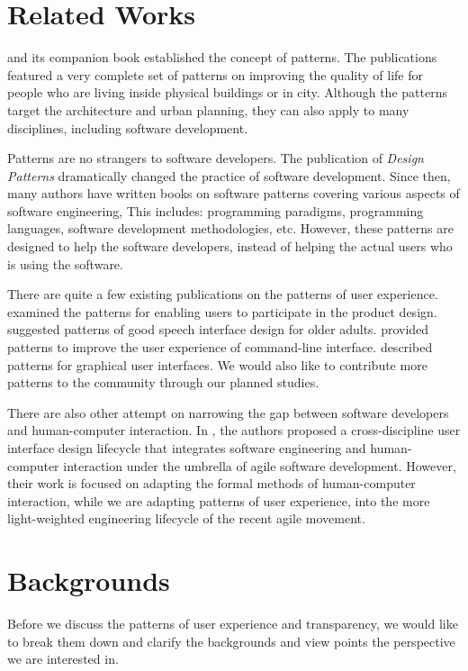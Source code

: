 \documentclass[a4paper,titlepage]{article}
\begin{document}
\section{Related Works}
\label{sec:related}
\citet{language:alexander} and its companion book
\citet{timeless:alexander} established the concept of patterns. The
publications featured a very complete set of patterns on improving the
quality of life for people who are living inside physical buildings or
in city. Although the patterns target the architecture and urban
planning, they can also apply to many disciplines, including software
development.

Patterns are no strangers to software developers. The publication of
\textit{Design Patterns} \citep{patterns:gamma} dramatically changed
the practice of software development. Since then, many authors have
written books on software patterns covering various aspects of
software engineering, This includes: programming paradigms,
programming languages, software development methodologies,
etc. However, these patterns are designed to help the software
developers, instead of helping the actual users who is using the
software.

There are quite a few existing publications on the patterns of user
experience. \citet{participatory:dearden} examined the patterns for
enabling users to participate in the product design.
\citet{speech:zajicek} suggested patterns of good speech interface
design for older adults. \citet{unix:raymond} provided patterns to
improve the user experience of command-line interface.
\citet{patterns:tidwell} described patterns for graphical user
interfaces. We would also like to contribute more patterns to the
community through our planned studies.

There are also other attempt on narrowing the gap between software
developers and human-computer interaction. In \citet{agile:memmel},
the authors proposed a cross-discipline user interface design
lifecycle that integrates software engineering and human-computer
interaction under the umbrella of agile software development. However,
their work is focused on adapting the formal methods of human-computer
interaction, while we are adapting patterns of user experience, into
the more light-weighted engineering lifecycle of the recent agile
movement.


\section{Backgrounds}
\label{sec:backgrounds}
Before we discuss the patterns of user experience and transparency, we
would like to break them down and clarify the backgrounds and view
points the perspective we are interested in.
\end{document}
